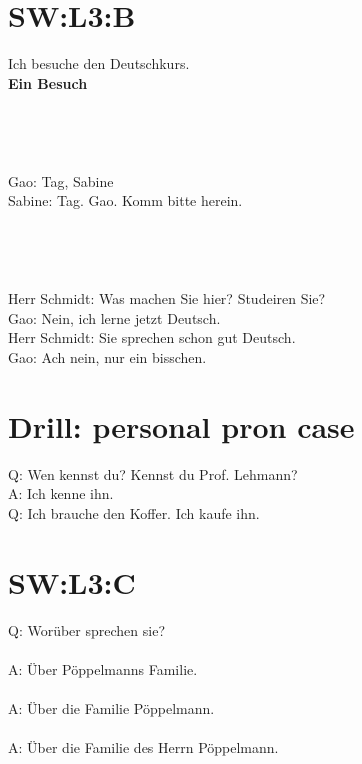 \section{SW:L3:B}
Ich besuche den Deutschkurs.  \\
\textbf{Ein Besuch}  \\
\\
\\
\\
\\
Gao: Tag, Sabine \\
Sabine: Tag. Gao. Komm bitte herein.  \\
\\
\\
\\
\\
Herr Schmidt: Was machen Sie hier? Studeiren Sie? \\
Gao: Nein, ich lerne jetzt Deutsch. \\
Herr Schmidt: Sie sprechen schon gut Deutsch.  \\
Gao: Ach nein, nur ein bisschen.  \\

\section{Drill: personal pron case}
\noindent
Q: Wen kennst du? Kennst du Prof. Lehmann?  \\
A: Ich kenne ihn. \\
Q: Ich brauche den Koffer. Ich kaufe ihn.  \\

\section{SW:L3:C}
\noindent
Q: Worüber sprechen sie?  \\
\\
A: Über Pöppelmanns Familie.  \\
\\
A: Über die Familie Pöppelmann.  \\
\\
A: Über die Familie des Herrn Pöppelmann.  \\

